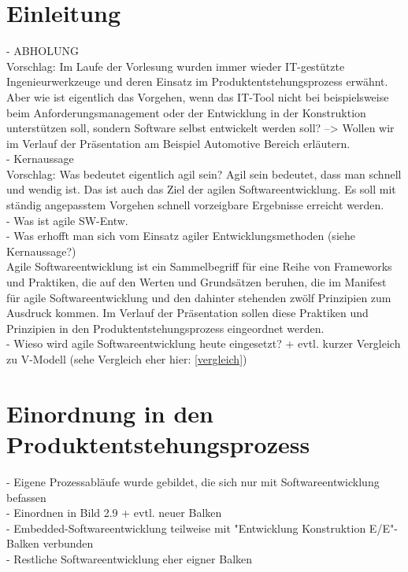 \section{Einleitung}
- ABHOLUNG\\
Vorschlag: Im Laufe der Vorlesung wurden immer wieder IT-gestützte Ingenieurwerkzeuge und deren Einsatz im Produktentstehungsprozess erwähnt. \cite{Daberkow2022} Aber wie ist eigentlich das Vorgehen, wenn das IT-Tool nicht bei beispielsweise beim Anforderungsmanagement oder der Entwicklung in der Konstruktion unterstützen soll, sondern Software selbst entwickelt werden soll? --> Wollen wir im Verlauf der Präsentation am Beispiel Automotive Bereich erläutern. \\
- Kernaussage\\
Vorschlag: Was bedeutet eigentlich agil sein? Agil sein bedeutet, dass man schnell und wendig ist. Das ist auch das Ziel der agilen Softwareentwicklung. Es soll mit ständig angepasstem Vorgehen schnell vorzeigbare Ergebnisse erreicht werden. \cite{wolf2011agile}\\
- Was ist agile SW-Entw.\\
- Was erhofft man sich vom Einsatz agiler Entwicklungsmethoden (siehe Kernaussage?)\\
\glqq Agile Softwareentwicklung ist ein Sammelbegriff für eine Reihe von Frameworks und Praktiken, die auf den Werten und Grundsätzen beruhen, die im Manifest für agile Softwareentwicklung und den dahinter stehenden zwölf Prinzipien zum Ausdruck kommen.\grqq  \cite{agile101} Im Verlauf der Präsentation sollen diese Praktiken und Prinzipien in den Produktentstehungsprozess eingeordnet werden. \\
- Wieso wird agile Softwareentwicklung heute eingesetzt? + evtl. kurzer Vergleich zu V-Modell (sehe Vergleich eher hier: \ref{vergleich})\\ 

\section{Einordnung in den Produktentstehungsprozess}
- Eigene Prozessabläufe wurde gebildet, die sich nur mit Softwareentwicklung befassen\\
- Einordnen in Bild 2.9 + evtl. neuer Balken\\
- Embedded-Softwareentwicklung teilweise mit "Entwicklung Konstruktion E/E"-Balken verbunden\\
- Restliche Softwareentwicklung eher eigner Balken\\
